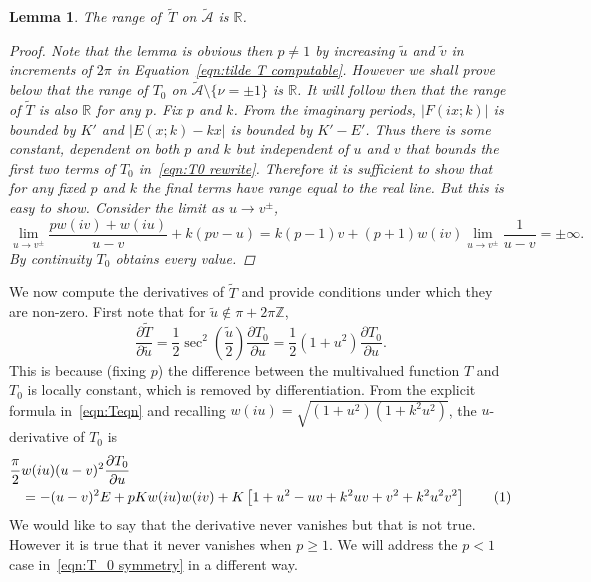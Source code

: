 \documentclass{article}
\numberwithin{equation}{section}
\numberwithin{figure}{section}
\newtheorem{lem}[equation]{Lemma}
\newcommand{\labelthis}[1]{\addtocounter{equation}{1}\tag{\theequation}\label{#1}}
\newcommand{\abs}[1]{\left|#1\right|}
\newcommand{\Partial}[2]{\frac{\partial #1}{\partial #2}}
\newcommand{\iu}{i}
\newcommand{\Z}{\mathbb{Z}}
\newcommand{\R}{\mathbb{R}}
\begin{document}
\begin{lem}\label{lem:range_T}
The range of \,$\tilde{T}$ on $\mathcal{\tilde{A}}$ is $\R$.

\begin{proof}
Note that the lemma is obvious then $p\neq 1$ by increasing $\tilde{u}$ and $\tilde{v}$ in increments of $2\pi$ in Equation~\eqref{eqn:tilde T computable}. However we shall prove below that the range of $T_0$ on $\mathcal{\tilde{A}} \setminus \{\nu = \pm 1\}$ is $\R$. It will follow then that the range of $\tilde{T}$ is also $\R$ for any $p$. Fix $p$ and $k$. From the imaginary periods, $\abs{F(\iu x;k)}$ is bounded by $K'$ and $\abs{E(x;k) - kx}$ is bounded by $K'-E'$. Thus there is some constant, dependent on both $p$ and $k$ but independent of $u$ and $v$ that bounds the first two terms of $T_0$ in~\eqref{eqn:T0 rewrite}.
Therefore it is sufficient to show that for any fixed $p$ and $k$ the final terms have range equal to the real line. But this is easy to show. Consider the limit as $u \to v^\pm$,
\[
\lim_{u \to v^\pm} \frac{pw(\iu v) + w(\iu u)}{u-v} + k(pv-u)
= k(p-1)v + (p+1) w(\iu v)\lim_{u \to v^\pm} \frac{1}{u-v} = \pm\infty.
\]
By continuity $T_0$ obtains every value.
\end{proof}
\end{lem}


We now compute the derivatives of $\tilde{T}$ and provide conditions under which they are non-zero. First note that for $\tilde{u} \not\in \pi + 2\pi\Z$,
\[
\Partial{\tilde{T}}{\tilde{u}} 
= \frac{1}{2}\sec^2\left(\frac{\tilde{u}}{2}\right) \Partial{T_0}{u}
= \frac{1}{2}(1+u^2) \Partial{T_0}{u}.
\] 
This is because (fixing $p$) the difference between the multivalued function $T$ and $T_0$ is locally constant, which is removed by differentiation.
From the explicit formula in~\eqref{eqn:Teqn} and recalling $w(\iu u) = \sqrt{(1+u^2)(1+k^2 u^2)}$, the $u$-derivative of $T_0$ is
\begin{align*}
\frac{\pi}{2}&w(\iu u)(u-v)^2\Partial{T_0}{u} \\
&= -(u-v)^2 E + pKw(\iu u)w(\iu v) + K\left[ 1 + u^2 - uv + k^2 uv + v^2 + k^2 u^2 v^2 \right]
\labelthis{eqn:dTdu}
\end{align*}
We would like to say that the derivative never vanishes but that is not true. However it is true that it never vanishes when $p \geq 1$. We will address the $p < 1$ case in~\eqref{eqn:T_0 symmetry} in a different way.
\end{document}
